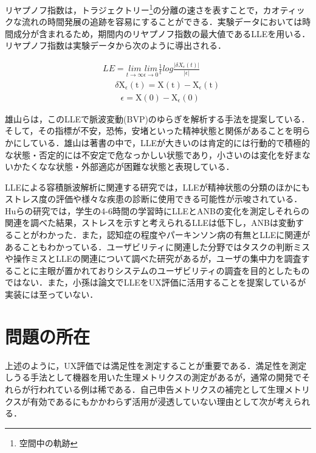 リヤプノフ指数は，トラジェクトリー\footnote{空間中の軌跡}の分離の速さを表すことで，カオティックな流れの時間発展の追跡を容易にすることができる\cite{berje}．実験データにおいては時間成分が含まれるため，期間内のリヤプノフ指数の最大値であるLLEを用いる．リヤプノフ指数は実験データから次のように導出される\cite{hu}．


\begin{align*}
&LE= \underset{t\rightarrow\infty}{lim} \underset{\epsilon\rightarrow 0}{lim}\frac{1}{t}log\frac{\vert \delta X_{\epsilon}(t)\vert}{\vert \epsilon\vert} \tag{2}\\ 
& \quad\ \ \delta\mathrm{X}_{\epsilon}(\mathrm{t})=\mathrm{X}(\mathrm{t})-\mathrm{X}_{\epsilon}(\mathrm{t}) \tag{3}\\ 
& \quad\ \ \ \ \ \epsilon=\mathrm{X}(0)-\mathrm{X}_{\epsilon}(0) \tag{4} 
\end{align*}


雄山らは，このLLEで脈波変動(BVP)のゆらぎを解析する手法を提案している\cite{oyama2006}．そして，その指標が不安，恐怖，安堵といった精神状態と関係があることを明らかにしている\cite{imanishi2007}．雄山は著書の中で，LLEが大きいのは肯定的には行動的で積極的な状態・否定的には不安定で危なっかしい状態であり，小さいのは変化を好まないかたくなな状態・外部適応が困難な状態と表現している\cite{oyama2012book}．

LLEによる容積脈波解析に関連する研究では，LLEが精神状態の分類のほかにもストレス度の評価や様々な疾患の診断に使用できる可能性が示唆されている．Huらの研究では，学生の4-6時間の学習時にLLEとANBの変化を測定しそれらの関連を調べた結果，ストレスを示すと考えられるLLEは低下し，ANBは変動することがわかった\cite{hu}．また，認知症の程度やパーキンソン病の有無とLLEに関連があることもわかっている\cite{oyama2006dimentia}\cite{oyama2018perkinson}．ユーザビリティに関連した分野ではタスクの判断ミスや操作ミスとLLEの関連について調べた研究\cite{imanishi2006}があるが，ユーザの集中力を調査することに主眼が置かれておりシステムのユーザビリティの調査を目的としたものではない．また，小孫は論文でLLEをUX評価に活用することを提案しているが実装には至っていない\cite{komago}．

\section{問題の所在}

上述のように，UX評価では満足性を測定することが重要である．満足性を測定しうる手法として機器を用いた生理メトリクスの測定があるが，通常の開発でそれらが行われている例は稀である．自己申告メトリクスの補完として生理メトリクスが有効であるにもかかわらず活用が浸透していない理由として次が考えられる．

